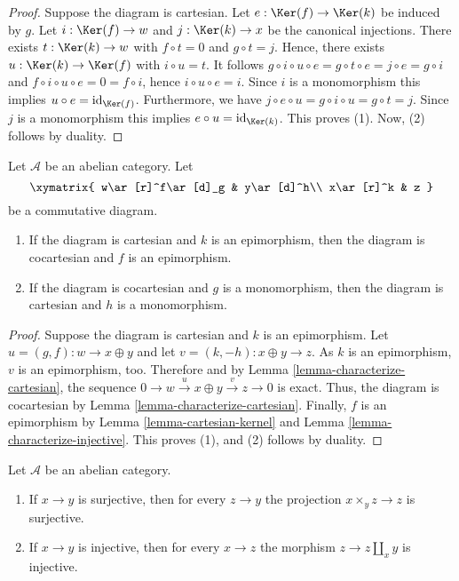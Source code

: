 \begin{proof}
Suppose the diagram is cartesian. Let 
$e:\Ker(f)\to\Ker(k)$ be induced by $g$. Let 
$i:\Ker(f)\to w$ and $j:\Ker(k)\to x$ be the canonical 
injections. There exists $t:\Ker(k)\to w$ with $f\circ t=0$ 
and $g\circ t=j$. Hence, there exists $u:\Ker(k)\to\Ker(f)$ 
with $i\circ u=t$. It follows 
$g\circ i\circ u\circ e=g\circ t\circ e=j\circ e=g\circ i$ and 
$f\circ i\circ u\circ e=0=f\circ i$, hence $i\circ u\circ e=i$. Since 
$i$ is a monomorphism this implies $u\circ e=\text{id}_{\Ker(f)}$.
Furthermore, we have $j\circ e\circ u=g\circ i\circ u=g\circ t=j$. 
Since $j$ is a monomorphism this implies $e\circ u=\text{id}_{\Ker(k)}$.
This proves (1). Now, (2) follows by duality.
\end{proof}

\begin{lemma}
\label{lemma-cartesian-cocartesian}
Let $\mathcal{A}$ be an abelian category. Let
$$
\xymatrix{
w\ar[r]^f\ar[d]_g
& y\ar[d]^h\\
x\ar[r]^k
& z
}
$$
be a commutative diagram.
\begin{enumerate}
\item If the diagram is cartesian and $k$ is an epimorphism, 
then the diagram is cocartesian and $f$ is an epimorphism.
\item If the diagram is cocartesian and $g$ is a monomorphism, 
then the diagram is cartesian and $h$ is a monomorphism.
\end{enumerate}
\end{lemma}

\begin{proof}
Suppose the diagram is cartesian and $k$ is an epimorphism. 
Let $u = (g, f) : w \to x \oplus y$ and let $v = (k, -h) : x \oplus y \to z$. 
As $k$ is an epimorphism, $v$ is an epimorphism, too. Therefore 
and by Lemma \ref{lemma-characterize-cartesian}, the sequence 
$0\to w\overset{u}\to x\oplus y\overset{v}\to z\to 0$ is exact. Thus, the 
diagram is cocartesian by Lemma \ref{lemma-characterize-cartesian}. Finally, 
$f$ is an epimorphism by Lemma \ref{lemma-cartesian-kernel} and 
Lemma \ref{lemma-characterize-injective}. This proves (1), and (2) 
follows by duality.
\end{proof}

\begin{lemma}
\label{lemma-epimorphism-universal-abelian-category}
Let $\mathcal{A}$ be an abelian category.
\begin{enumerate}
\item If $x \to y$ is surjective, then for every $z \to y$ the
projection $x \times_y z \to z$ is surjective.
\item If $x \to y$ is injective, then for every $x \to z$ the
morphism $z \to z \amalg_x y$ is injective.
\end{enumerate}
\end{lemma}

